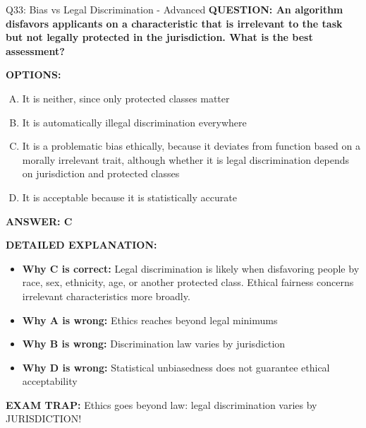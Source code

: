 \documentclass[8pt]{beamer}
\begin{document}
\begin{frame}[shrink=6]{Q33: Bias vs Legal Discrimination - Advanced}
\fontsize{6.5}{7.5}\selectfont
\textbf{QUESTION: An algorithm disfavors applicants on a characteristic that is irrelevant to the task but not legally protected in the jurisdiction. What is the best assessment?}

\vspace{0.1cm}
\textbf{OPTIONS:}
\begin{enumerate}[A.]
\item It is neither, since only protected classes matter
\item It is automatically illegal discrimination everywhere
\item It is a problematic bias ethically, because it deviates from function based on a morally irrelevant trait, although whether it is legal discrimination depends on jurisdiction and protected classes
\item It is acceptable because it is statistically accurate
\end{enumerate}

\vspace{0.1cm}
\textcolor{myblue}{\textbf{ANSWER: C}}

\vspace{0.1cm}
\textbf{DETAILED EXPLANATION:}
\begin{itemize}
\item \textbf{Why C is correct:} Legal discrimination is likely when disfavoring people by race, sex, ethnicity, age, or another protected class. Ethical fairness concerns irrelevant characteristics more broadly.
\item \textbf{Why A is wrong:} Ethics reaches beyond legal minimums
\item \textbf{Why B is wrong:} Discrimination law varies by jurisdiction
\item \textbf{Why D is wrong:} Statistical unbiasedness does not guarantee ethical acceptability
\end{itemize}

\textcolor{myred}{\textbf{EXAM TRAP:}} Ethics goes beyond law: legal discrimination varies by JURISDICTION!
\end{frame}

\end{document}
